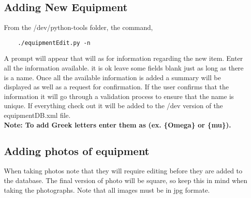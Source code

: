 \documentclass[justified]{book}
\begin{document}
\subsection{Adding New Equipment}


From the /dev/python-tools folder, the command,

	\begin{lstlisting}
	./equipmentEdit.py -n       
	\end{lstlisting}

A prompt will appear that will as for information regarding the new item. Enter all the information available. it is ok leave some fields blank just as long as there is a name. Once all the available information is added a summary will be displayed as well as a request for confirmation. If the user confirms that the information it will go through a validation process to ensure that the name is unique. If everything check out it will be added to the /dev version of the equipmentDB.xml file.\\

{\bf Note: To add Greek letters enter them as (ex. \{Omega\} or \{mu\}).}




\subsection{Adding photos of equipment}

When taking photos note that they will require editing before they are added to the database. The final version of photo will be square, so keep this in mind when taking the photographs. Note that all images must be in jpg formate.
\end{document}
